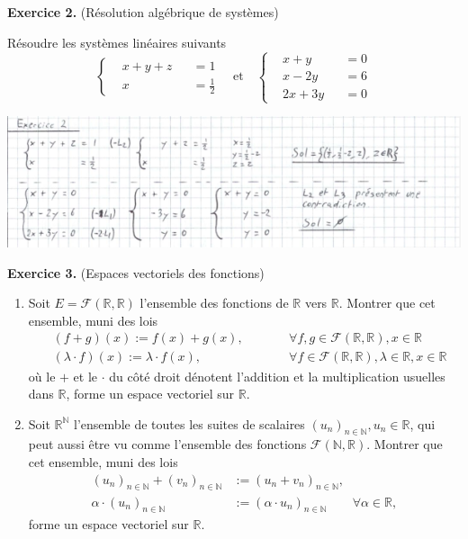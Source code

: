 \documentclass[a4paper, 10pt]{report}
\begin{document}
	\fancyhf{}
	\renewcommand{\headrule}
		{\rule{\textwidth}{0pt}}
	
	\noindent
	\textbf{Exercice 2.} (Résolution algébrique de systèmes)
	
	\indent Résoudre les systèmes linéaires suivants
	\[
		\left\{
		\begin{aligned}
			&x + y + z &&= 1\\
			&x &&= \frac{1}{2}
		\end{aligned}
		\right.
		\quad \text{et} \quad
		\left\{
		\begin{aligned}
			&x + y &&= 0\\
			&x - 2y &&= 6\\
			&2x + 3y &&= 0
		\end{aligned}
		\right.
	\]
	
	\includegraphics{ex02.png}

	\vspace{5mm}
	\noindent
	\textbf{Exercice 3.} (Espaces vectoriels des fonctions)
	
	\begin{enumerate}[label=\arabic*.]
		\item Soit $E = \mathcal{F}(\mathbb{R}, \mathbb{R})$
		l'ensemble des fonctions de $\mathbb{R}$ vers $\mathbb{R}$.
		Montrer que cet ensemble, muni des lois
		\[
			\begin{aligned}
				&(f + g)(x) := f(x) + g(x),
				\qquad
				& &\forall f, g \in \mathcal{F}(\mathbb{R}, \mathbb{R}),
				x \in \mathbb{R}\\
				&(\lambda \cdot f)(x) := \lambda \cdot f(x),
				\qquad
				& &\forall f \in \mathcal{F}(\mathbb{R}, \mathbb{R}),
				\lambda \in \mathbb{R}, x \in \mathbb{R}
			\end{aligned}
		\]
		où le $+$ et le $\cdot$ du côté droit dénotent l'addition
		et la multiplication usuelles dans $\mathbb{R}$, forme un
		espace vectoriel sur $\mathbb{R}$.
			
		\item Soit $\mathbb{R}^{\mathbb{N}}$ l'ensemble de toutes
		les suites de scalaires
		$(u_n)_{n \in \mathbb{N}}, u_n \in \mathbb{R}$, qui peut
		aussi être vu comme l'ensemble des fonctions
		$\mathcal{F}(\mathbb{N}, \mathbb{R})$. Montrer que cet
		ensemble, muni des lois
		\[
			\begin{split}
				(u_n)_{n \in \mathbb{N}} + (v_n)_{n \in \mathbb{N}} &:=
				(u_n + v_n)_{n \in \mathbb{N}},\\
				\alpha \cdot (u_n)_{n \in \mathbb{N}} &:=
				(\alpha \cdot u_n)_{n \in \mathbb{N}}
				\qquad
				\forall \alpha \in \mathbb{R},
			\end{split}
		\]
		forme un espace vectoriel sur $\mathbb{R}$.
	\end{enumerate}
	
\end{document}
